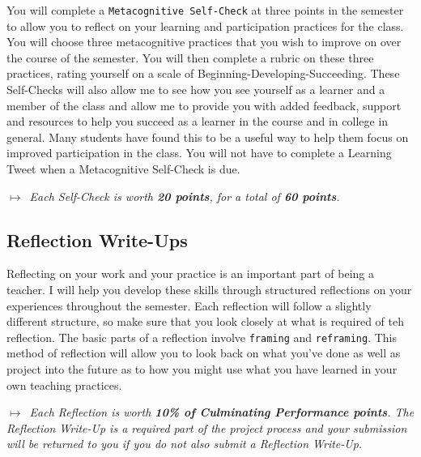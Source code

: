\documentclass{tufte-handout}
\begin{document}
You will complete a \texttt{Metacognitive Self-Check} at three points in the semester to allow you to reflect on your learning and participation practices for the class. You will choose three metacognitive practices that you wish to improve on over the course of the semester. You will then complete a rubric on these three practices, rating yourself on a scale of Beginning-Developing-Succeeding. These Self-Checks will also allow me to see how you see yourself as a learner and a member of the class and allow me to provide you with added feedback, support and resources to help you succeed as a learner in the course and in college in general. Many students have found this to be a useful way to help them focus on improved participation in the class. You will not have to complete a Learning Tweet when a Metacognitive Self-Check is due.

\medskip\noindent\textit{$\mapsto$~Each Self-Check is worth \textbf{20 points}, for a total of \textbf{60 points}.}

\subsection{Reflection Write-Ups}

Reflecting on your work and your practice is an important part of being a teacher. I will help you develop these skills through structured reflections on your experiences throughout the semester. Each reflection will follow a slightly different structure, so make sure that you look closely at what is required of teh reflection. The basic parts of a reflection involve \texttt{framing} and \texttt{reframing}. This method of reflection will allow you to look back on what you've done as well as project into the future as to how you might use what you have learned in your own teaching practices.

\medskip\noindent\textit{$\mapsto$~Each Reflection is worth \textbf{10\% of Culminating Performance points}. The Reflection Write-Up is a required part of the project process and your submission will be returned to you if you do not also submit a Reflection Write-Up.}
\end{document}
